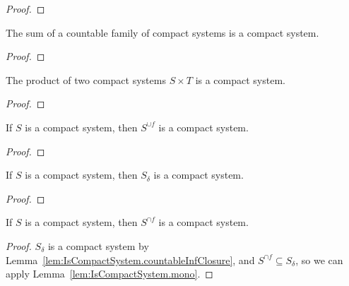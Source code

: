 \begin{proof}

\end{proof}


\begin{lemma}\label{lem:IsCompactSystem.sigma}
  \leanok
The sum of a countable family of compact systems is a compact system.
\end{lemma}

\begin{proof}\leanok

\end{proof}


\begin{lemma}\label{lem:IsCompactSystem.image2_prod}
The product of two compact systems $S \times T$ is a compact system.
\end{lemma}

\begin{proof}

\end{proof}


\begin{lemma}\label{lem:IsCompactSystem.supClosure}
If $S$ is a compact system, then $S^{\cup f}$ is a compact system.
\end{lemma}

\begin{proof}

\end{proof}


\begin{lemma}\label{lem:IsCompactSystem.countableInfClosure}
If $S$ is a compact system, then $S_\delta$ is a compact system.
\end{lemma}

\begin{proof}

\end{proof}


\begin{lemma}\label{lem:IsCompactSystem.infClosure}
If $S$ is a compact system, then $S^{\cap f}$ is a compact system.
\end{lemma}

\begin{proof}
$S_\delta$ is a compact system by Lemma~\ref{lem:IsCompactSystem.countableInfClosure}, and $S^{\cap f} \subseteq S_\delta$, so we can apply Lemma~\ref{lem:IsCompactSystem.mono}.
\end{proof}


